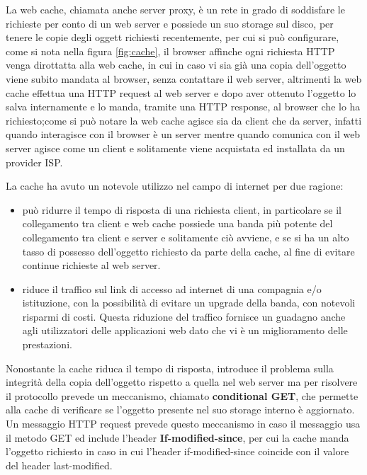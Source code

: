\message{ !name(sd.tex)}\documentclass[a4paper,12pt, oneside]{book}
\begin{document}
La web cache, chiamata anche server proxy, è un rete in grado di soddisfare le richieste per conto di un
web server e possiede un suo storage sul disco, per tenere le copie degli oggett richiesti recentemente,
per cui si può configurare, come si nota nella figura \ref{fig:cache}, il browser affinche ogni richiesta 
HTTP venga dirottatta alla web cache, in cui in caso vi sia già una copia dell'oggetto viene subito 
mandata al browser, senza contattare il web server, altrimenti la web cache effettua una HTTP request
al web server e dopo aver ottenuto l'oggetto lo salva internamente e lo manda, tramite una HTTP response,
al browser che lo ha richiesto;come si può notare la web cache agisce sia da client che da server, infatti
quando interagisce con il browser è un server mentre quando comunica con il web server agisce come un client
e solitamente viene acquistata ed installata da un provider ISP.

La cache ha avuto un notevole utilizzo nel campo di internet per due ragione:
\begin{itemize}
    \item può ridurre il tempo di risposta di una richiesta client, in particolare se il collegamento
        tra client e web cache possiede una banda più potente del collegamento tra client e server
        e solitamente ciò avviene, e se si ha un alto tasso di possesso dell'oggetto richiesto da parte
        della cache, al fine di evitare continue richieste al web server.

    \item riduce il traffico sul link di accesso ad internet di una compagnia e/o istituzione, con la
        possibilità di evitare un upgrade della banda, con notevoli risparmi di costi.\newline
        Questa riduzione del traffico fornisce un guadagno anche agli utilizzatori delle applicazioni web
        dato che vi è un miglioramento delle prestazioni.
\end{itemize}
Nonostante la cache riduca il tempo di risposta, introduce il problema sulla integrità della copia
dell'oggetto rispetto a quella nel web server ma per risolvere il protocollo prevede un meccanismo, 
chiamato \textbf{conditional GET}, che permette alla cache di verificare se l'oggetto presente nel
suo storage interno è aggiornato.\newline
Un messaggio HTTP request prevede questo meccanismo in caso il messaggio usa il metodo GET ed 
include l'header \textbf{If-modified-since}, per cui la cache manda l'oggetto richiesto in caso 
in cui l'header if-modified-since coincide con il valore del header last-modified.
\end{document}
